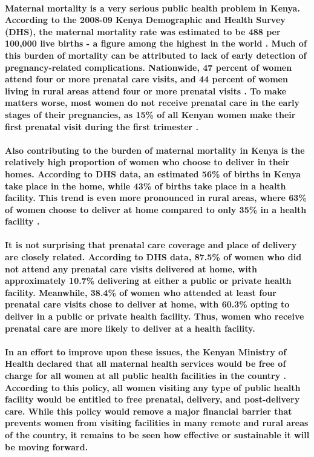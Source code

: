 \paragraph{Maternal mortality is a very serious public health problem in Kenya. According to the 2008-09 Kenya Demographic and Health Survey (DHS), the maternal mortality rate was estimated to be 488 per 100,000 live births - a figure among the highest in the world \citep{DHS2010}. Much of this burden of mortality can be attributed to lack of early detection of pregnancy-related complications. Nationwide, 47 percent of women attend four or more prenatal care visits, and 44 percent of women living in rural areas attend four or more prenatal visits \citep{DHS2010}. To make matters worse, most women do not receive prenatal care in the early stages of their pregnancies, as 15\% of all Kenyan women make their first prenatal visit during the first trimester \citep{DHS2010}.}

\paragraph{Also contributing to the burden of maternal mortality in Kenya is the relatively high proportion of women who choose to deliver in their homes. According to DHS data, an estimated 56\% of births in Kenya take place in the home, while 43\% of births take place in a health facility. This trend is even more pronounced in rural areas, where 63\% of women choose to deliver at home compared to only 35\% in a health facility \citep{DHS2010}.}

\paragraph{It is not surprising that prenatal care coverage and place of delivery are closely related. According to DHS data, 87.5\% of women who did not attend any prenatal care visits delivered at home, with approximately 10.7\% delivering at either a public or private health facility. Meanwhile, 38.4\% of women who attended at least four prenatal care visits chose to deliver at home, with 60.3\% opting to deliver in a public or private health facility. Thus, women who receive prenatal care are more likely to deliver at a health facility.}

\paragraph{In an effort to improve upon these issues, the Kenyan Ministry of Health declared that all maternal health services would be free of charge for all women at all public health facilities in the country \citep{MOH2013}. According to this policy, all women visiting any type of public health facility would be entitled to free prenatal, delivery, and post-delivery care. While this policy would remove a major financial barrier that prevents women from visiting facilities in many remote and rural areas of the country, it remains to be seen how effective or sustainable it will be moving forward.}

